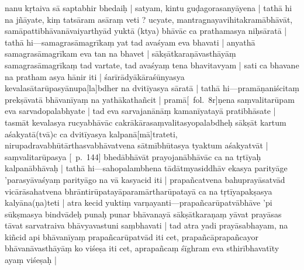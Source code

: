 \documentclass[12pt]{article}
\newcommand{\emdash} {\hspace{0em}—\hspace{0em}}
\begin{document}
nanu kṛtaiva sā saptabhir bhedaiḥ | satyam, kintu guḍagorasanyāyena | tathā hi na jñāyate, kiṃ tatsāram asāraṃ veti ? ucyate, mantragnayavihitakramābhāvāt, samāpattibhāvanāvaiyarthyād yuktā (ktya) bhāvāc ca prathamasya niḥsāratā | tathā hi\emdash samagrasāmagrīkaṃ yat tad avaśyam eva bhavati | anyathā samagrasāmagrīkam eva tan na bhavet | sākṣātkaraṇāvasthāyāṃ samagrasāmagrīkaṃ tad vartate, tad avaśyaṃ tena bhavitavyam | sati ca bhavane na pratham asya hānir iti | śarīrādyākāraśūnyasya kevalasātarūpasyānupa[la]bdher na dvitīyasya sāratā | tathā hi\emdash pramāṇaniścitaṃ prekṣāvatā bhāvanīyaṃ na yathākathañcit | pramā[\MS\ fol.\ 8r]ṇena saṃvalitarūpam eva sarvadopalabhyate | tad eva sarvajanānāṃ kamanīyatayā pratibhāsate | tasmāt kevalasya rucyabhāvāc cakrākārasaṃvalitasyopalabdheḥ sākṣāt kartum aśakyatā(tvā)c ca dvitīyasya kalpanā[mā]trateti, nirupadravabhūtārthasvabhāvatvena sātmībhūtasya tyaktum aśakyatvāt | saṃvalitarūpasya [\EDD\ p.\ 144] bhedābhāvāt prayojanābhāvāc ca na tṛtīyaḥ kalpanābhāvaḥ | tathā hi\emdash sahopalambhena tādātmyasiddhāv ekasya parityāge 'parasyāvaśyaṃ parityāgo na vā kasyacid iti | prapañcatvena bahuprayāsatvād vicārāsahatvena bhrāntirūpatayāparamārtharūpatayā ca na tṛtīyapakṣasya kalyāna(ṇa)teti |  atra kecid yuktiṃ varṇayanti\emdash prapañcarūpatvābhāve 'pi sūkṣmasya bindvādeḥ punaḥ punar bhāvanayā sākṣātkaraṇaṃ yāvat prayāsas tāvat sarvatraiva bhāvyavastuni saṃbhavati | tad atra yadi prayāsabhayam, na kiñcid api bhāvanīyaṃ prapañcarūpatvād iti cet, prapañcāprapañcayor bhāvanāvasthāyāṃ ko viśeṣa iti cet, aprapañcaṃ śīghram eva sthirībhavatīty ayaṃ viśeṣaḥ |\\
\end{document}
